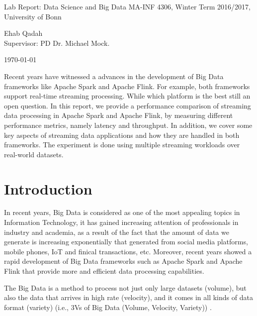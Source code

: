 \documentclass[]{article}
\begin{document}
\begin{flushleft}

\vspace{4pt}

\centering
 Lab Report: Data Science and Big Data MA-INF 4306,
 Winter Term 2016/2017, University of Bonn

\vspace{4pt}
\centering
 Ehab Qadah\\
 Supervisor: PD Dr. Michael Mock.
 \vspace{4pt}
 
 \today
\end{flushleft}


\begin{abstract}

\end{abstract}
Recent years have witnessed a advances in the  development of Big Data frameworks like Apache Spark and Apache Flink. For example, both frameworks support real-time
streaming processing. While which platform is the best still an open question. 
In this report, we provide a performance comparison of streaming data processing in Apache Spark and Apache Flink, by measuring different performance metrics, namely latency and throughput. In addition, we cover some key aspects of streaming data applications and how they are handled in both frameworks. The experiment is done using multiple streaming workloads over real-world datasets.
\section{Introduction}

\par In recent years, Big Data is considered as one of the most appealing topics in Information Technology, it has gained increasing attention of professionals in industry and academia, as a result of the fact that the amount of data we generate is increasing exponentially \cite{idc} that generated from social media platforms, mobile phones, IoT and finical transactions, etc. Moreover, recent years showed a rapid development of Big Data frameworks such as Apache Spark and Apache Flink that provide more and efficient data processing capabilities.
 \par The Big Data is a method to process not just only large datasets (volume), but also the data that arrives in high rate (velocity), and it comes in all kinds of data format (variety) (i.e., 3Vs of Big Data (Volume, Velocity, Variety)) \cite{svs}.
\end{document}
